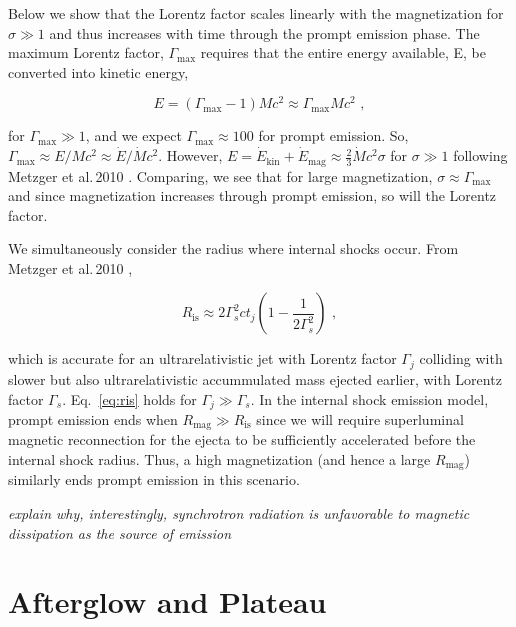 \documentclass{article}
\begin{document}
Below we show that the Lorentz factor scales linearly with the magnetization for $\sigma \gg 1$ and thus increases with time through the prompt emission phase.
The maximum Lorentz factor, $\Gamma_{\mathrm{max}}$ requires that the entire energy available, E, be  converted into kinetic energy,

\begin{equation} E = (\Gamma_{\mathrm{max}}-1) M c^2 \approx \Gamma_{\mathrm{max}} M c^2 \,\,,
\end{equation}

for $\Gamma_{\mathrm{max}} \gg 1$, and we expect $\Gamma_{\mathrm{max}}\approx 100$ for prompt emission. So, $\Gamma_{\mathrm{max}} \approx E/{M c^2} \approx \dot{E}/\dot{M} c^2$. However, $E=\dot{E}_{\mathrm{kin}}+\dot{E}_{\mathrm{mag}} \approx \frac{2}{3} \dot{M} c^2 \sigma$ for $\sigma \gg 1$ following Metzger et al.\,2010 \cite{Metzger:2010pp}. Comparing, we see that for large magnetization, $\sigma \approx \Gamma_{\mathrm{max}}$ and since magnetization increases through prompt emission, so will the Lorentz factor.

We simultaneously consider the radius where internal shocks occur. From Metzger et al.\,2010 \cite{Metzger:2010pp},

\begin{equation}\label{eq:ris}
R_{\mathrm{is}} \approx 2\Gamma_s^2 c t_j\left(1-\frac{1}{2\Gamma_s^2}\right)\,\,,
\end{equation}

which is accurate for an ultrarelativistic jet with Lorentz factor $\Gamma_j$ colliding with slower but also ultrarelativistic accummulated mass ejected earlier, with Lorentz factor $\Gamma_s$. Eq.~\ref{eq:ris} holds for $\Gamma_{j}\gg \Gamma_{s}$. In the internal shock emission model, prompt emission ends when $R_{\mathrm{mag}} \gg R_{\mathrm{is}}$ since we will require superluminal magnetic reconnection for the ejecta to be sufficiently accelerated before the internal shock radius. Thus, a high magnetization (and hence a large $R_{\mathrm{mag}}$) similarly ends prompt emission in this scenario.

\textit{explain why, interestingly, synchrotron radiation is unfavorable to magnetic dissipation as the source of emission}

\section{Afterglow and Plateau}
\end{document}
